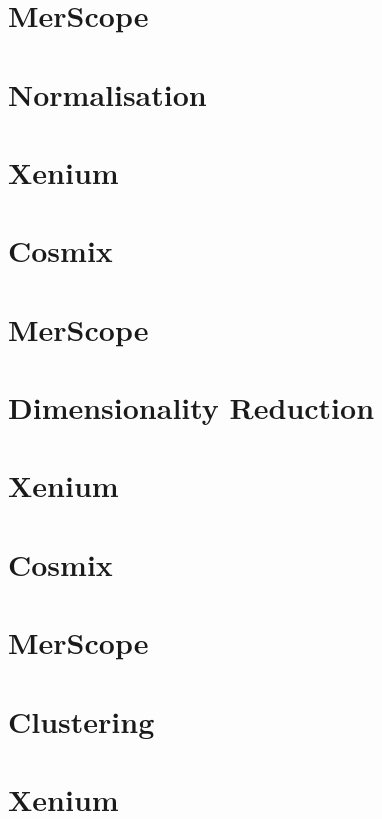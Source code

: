 \documentclass[
]{book}
\begin{document}
\chapter{MerScope}\label{merscope-1}

\chapter{Normalisation}\label{normalisation}

\chapter{Xenium}\label{xenium-2}

\chapter{Cosmix}\label{cosmix-2}

\chapter{MerScope}\label{merscope-2}

\chapter{Dimensionality Reduction}\label{dimensionality-reduction}

\chapter{Xenium}\label{xenium-3}

\chapter{Cosmix}\label{cosmix-3}

\chapter{MerScope}\label{merscope-3}

\chapter{Clustering}\label{clustering}

\chapter{Xenium}\label{xenium-4}
\end{document}

